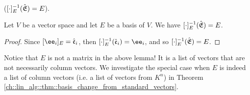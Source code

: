 \begin{lemma}
    \label{ch::lin_alg::lemma::basis_inverse}
    ($[\cdot]_E^{-1}({\hat{\mathfrak{E}}}) = E$).

    Let $V$ be a vector space and let $E$ be a basis of $V$. We have $[\cdot]_E^{-1}({\hat{\mathfrak{E}}}) = E$. 
\end{lemma}

\begin{proof}
    Since $[\ee_i]_E = \see_i$, then $[\cdot]_E^{-1}(\see_i) = \ee_i$, and so $[\cdot]_E^{-1}({\hat{\mathfrak{E}}}) = E$. 
\end{proof}

Notice that $E$ is not a matrix in the above lemma! It is a list of vectors that are not necessarily column vectors. We investigate the special case when $E$ is indeed a list of column vectors (i.e. a list of vectors from $K^n$) in Theorem \ref{ch::lin_alg::thm::basis_change_from_standard_vectors}.

